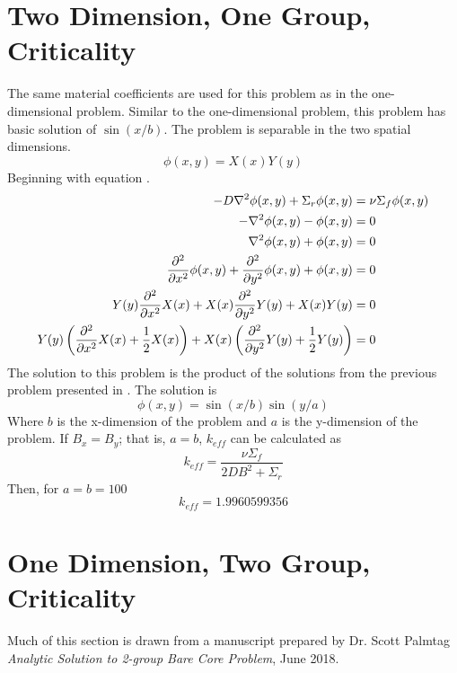 \section{Two Dimension, One Group, Criticality}
  The same material coefficients are used for this problem as in the 
  one-dimensional problem. Similar to the one-dimensional problem, this 
  problem has basic solution of $\sin(x/b)$. The problem is separable in the 
  two spatial dimensions. 
  \begin{equation}
    \phi(x,y) = X(x) Y(y) 
  \end{equation}
  Beginning with equation .
  \begin{align}
    -D \mathbf{\nabla}^2 \phi(x,y) + \Sigma_r \phi(x,y) &= \nu \Sigma_f \phi(x,y) \\
    - \mathbf{\nabla}^2 \phi(x,y) - \phi(x,y) &= 0 \\
    \mathbf{\nabla}^2 \phi(x,y) + \phi(x,y) &= 0 \\
    \frac{\partial^2}{\partial x^2} \phi(x,y) + 
      \frac{\partial^2}{\partial y^2} \phi(x,y) +
      \phi(x,y) &= 0\\
    Y(y)\frac{\partial^2}{\partial x^2}X(x) +
      X(x) \frac{\partial^2}{\partial y^2} Y(y) + X(x)Y(y) &= 0\\
    Y(y)\left(\frac{\partial^2}{\partial x^2}X(x) + \frac{1}{2} X(x)\right)+
      X(x)\left(\frac{\partial^2}{\partial y^2}Y(y) + \frac{1}{2}Y(y)
      \right) &= 0
  \end{align}
  The solution to this problem is the product of the solutions from the 
  previous problem presented in . The solution is
  \begin{equation} \label{eq:twodimensionsol}
    \phi(x,y) = \sin(x/b) \sin(y/a)
  \end{equation}
  Where $b$ is the x-dimension of the problem and $a$ is the y-dimension of 
  the problem.
  If $B_x=B_y$; that is, $a=b$,  $k_{eff}$ can be calculated as
  \begin{equation}
    k_{eff} = \frac{\nu \Sigma_f}{2DB^2 + \Sigma_r} 
  \end{equation}
  Then, for $a = b = 100$
  \[ k_{eff} = 1.9960599356 \]
\section{One Dimension, Two Group, Criticality}
  Much of this section is drawn from a manuscript prepared by Dr. Scott 
  Palmtag \textit{Analytic Solution to 2-group Bare Core Problem}, June 2018.
  
